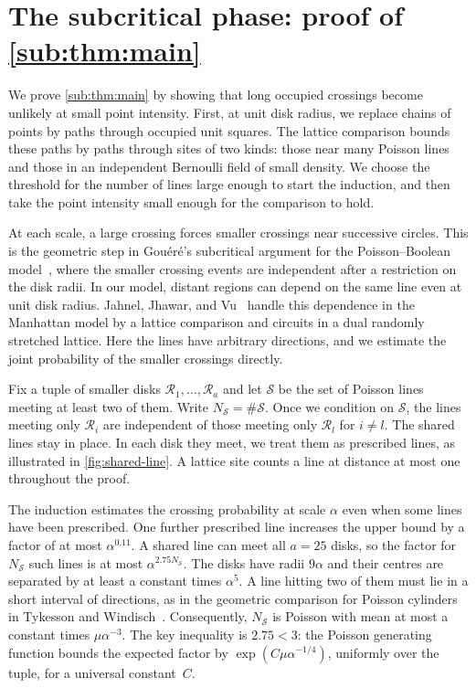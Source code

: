 \documentclass[11pt,letterpaper]{article}
\newcommand{\cS}{\mathcal S}
\begin{document}
\section{The subcritical phase: proof of \texorpdfstring{\cref{sub:thm:main}}{the second main theorem}}
\label{sec:subcritical}

We prove \cref{sub:thm:main} by showing that long occupied crossings become unlikely at small point intensity. First, at unit disk radius, we replace chains of points by paths through occupied unit squares. The lattice comparison bounds these paths by paths through sites of two kinds: those near many Poisson lines and those in an independent Bernoulli field of small density. We choose the threshold for the number of lines large enough to start the induction, and then take the point intensity small enough for the comparison to hold.

At each scale, a large crossing forces smaller crossings near successive circles. This is the geometric step in Gou\'er\'e's subcritical argument for the Poisson--Boolean model~\cite[Lemma~3.3]{Gou08}, where the smaller crossing events are independent after a restriction on the disk radii. In our model, distant regions can depend on the same line even at unit disk radius.
Jahnel, Jhawar, and Vu~\cite[Propositions~3.3--3.5]{JJV23} handle this dependence in the Manhattan model by a lattice comparison and circuits in a dual randomly stretched lattice. Here the lines have arbitrary directions, and we estimate the joint probability of the smaller crossings directly.

Fix a tuple of smaller disks $\mathcal R_1,\dots,\mathcal R_a$ and let $\cS$ be the set of Poisson lines meeting at least two of them. Write $N_{\cS}=\#\cS$. Once we condition on $\cS$, the lines meeting only $\mathcal R_i$ are independent of those meeting only $\mathcal R_l$ for $i\ne l$. The shared lines stay in place. In each disk they meet, we treat them as prescribed lines, as illustrated in \cref{fig:shared-line}. A lattice site counts a line at distance at most one throughout the proof.

The induction estimates the crossing probability at scale $\alpha$ even when some lines have been prescribed. One further prescribed line increases the upper bound by a factor of at most $\alpha^{0.11}$. A shared line can meet all $a=25$ disks, so the factor for $N_{\cS}$ such lines is at most $\alpha^{2.75N_{\cS}}$. The disks have radii $9\alpha$ and their centres are separated by at least a constant times $\alpha^5$. A line hitting two of them must lie in a short interval of directions, as in the geometric comparison for Poisson cylinders in Tykesson and Windisch~\cite[Lemma~3.1]{TW12}. Consequently, $N_{\cS}$ is Poisson with mean at most a constant times $\mu\alpha^{-3}$. The key inequality is $2.75<3$: the Poisson generating function bounds the expected factor by $\exp(C\mu\alpha^{-1/4})$, uniformly over the tuple, for a universal constant~$C$.
\end{document}
